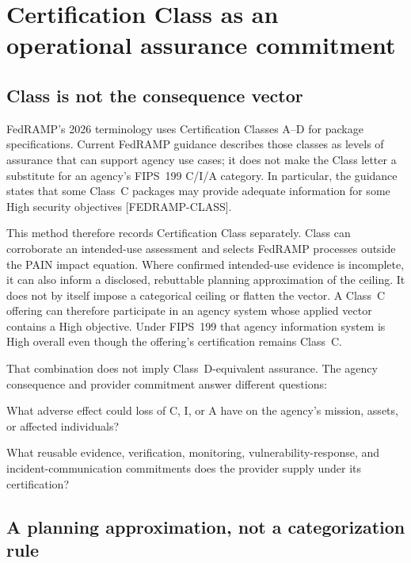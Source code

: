 \documentclass[11pt]{article}
\begin{document}
\section{Certification Class as an operational assurance commitment}

\subsection{Class is not the consequence vector}

FedRAMP's 2026 terminology uses Certification Classes A--D for package
specifications. Current FedRAMP guidance describes those classes as levels of
assurance that can support agency use cases; it does not make the Class letter a
substitute for an agency's FIPS~199 C/I/A category. In particular, the guidance
states that some Class~C packages may provide adequate information for some High
security objectives \mbox{[FEDRAMP-CLASS]}.

This method therefore records Certification Class separately. Class can corroborate
an intended-use assessment and selects FedRAMP processes outside the PAIN impact
equation. Where confirmed intended-use evidence is incomplete, it can also inform
a disclosed, rebuttable planning approximation of the ceiling. It does not by
itself impose a categorical ceiling or flatten the vector. A Class~C offering can
therefore participate in an agency system whose applied vector contains a High
objective. Under FIPS~199 that agency information system is High overall even
though the offering's certification remains Class~C.

That combination does not imply Class~D-equivalent assurance. The agency consequence
and provider commitment answer different questions:

\begin{description}[leftmargin=2.2em,style=nextline]
\item[Consequence vector] What adverse effect could loss of C, I, or A have on the
  agency's mission, assets, or affected individuals?
\item[Certification Class] What reusable evidence, verification, monitoring,
  vulnerability-response, and incident-communication commitments does the provider
  supply under its certification?
\end{description}

\subsection{A planning approximation, not a categorization rule}
\end{document}
